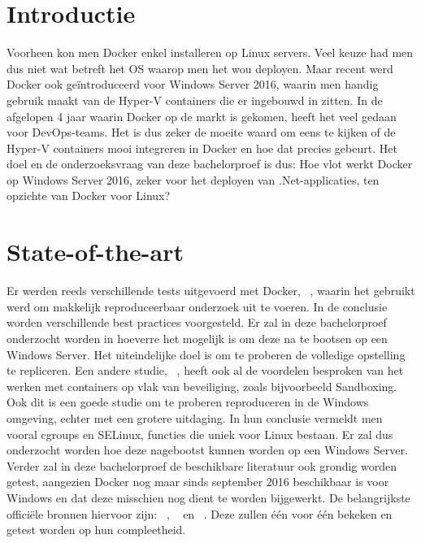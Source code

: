 
\section{Introductie} %
\label{sec:introductie}

Voorheen kon men Docker enkel installeren op Linux servers. Veel keuze had men dus niet wat betreft het OS waarop men het wou deployen. Maar recent werd Docker ook geïntroduceerd voor Windows Server 2016, waarin men handig gebruik maakt van de Hyper-V containers die er ingebouwd in zitten.
In de afgelopen 4 jaar waarin Docker op de markt is gekomen, heeft het veel gedaan voor DevOps-teams. Het is dus zeker de moeite waard om eens te kijken of de Hyper-V containers mooi integreren in Docker en hoe dat precies gebeurt.
Het doel en de onderzoeksvraag van deze bachelorproef is dus: Hoe vlot werkt Docker op Windows Server 2016, zeker voor het deployen van .Net-applicaties, ten opzichte van Docker voor Linux?


\section{State-of-the-art}
\label{sec:state-of-the-art}

Er werden reeds verschillende tests uitgevoerd met Docker, ~\autocite{Boettiger2014}, waarin het gebruikt werd om makkelijk reproduceerbaar onderzoek uit te voeren. In de conclusie worden verschillende best practices voorgesteld. Er zal in deze bachelorproef onderzocht worden in hoeverre het mogelijk is om deze na te bootsen op een Windows Server. Het uiteindelijke doel is om te proberen de volledige opstelling te repliceren.
Een andere studie, ~\autocite{Salman2016}, heeft ook al de voordelen besproken van het werken met containers op vlak van beveiliging, zoals bijvoorbeeld Sandboxing. Ook dit is een goede studie om te proberen reproduceren in de Windows omgeving, echter met een grotere uitdaging. In hun conclusie vermeldt men vooral cgroups en SELinux, functies die uniek voor Linux bestaan. Er zal dus onderzocht worden hoe deze nagebootst kunnen worden op een Windows Server.
Verder zal in deze bachelorproef de beschikbare literatuur ook grondig worden getest, aangezien Docker nog maar sinds september 2016 beschikbaar is voor Windows en dat deze misschien nog dient te worden bijgewerkt.
De belangrijkste officiële bronnen hiervoor zijn: ~\autocite{Docker2016}, ~\autocite{Friis2016} en ~\autocite{Container2016}. Deze zullen één voor één bekeken en getest worden op hun compleetheid.

